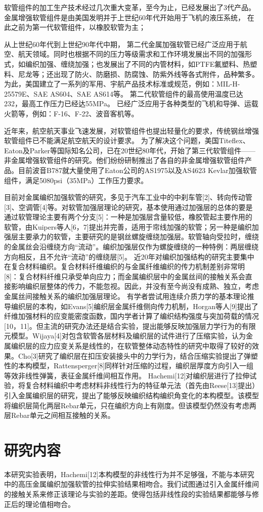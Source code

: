 软管组件的加工生产技术经过几次重大变革，至今为止，已经发展出了3代产品。
金属增强软管组件是由美国发明并于上世纪60年代开始用于飞机的液压系统，
在此之前为第一代软管组件，以橡胶软管为主；

从上世纪60年代到上世纪90年代中期，
第二代金属加强软管已经广泛应用于航空、航天领域。同时也根据不同的压力等级需求和工作环境发展出不同的加强形式，如编织加强、缠绕加强；也发展出了不同的内管材料，如PTFE氟塑料、热塑料、尼龙等；还出现了防火、防磨损、防腐蚀、防紫外线等各式附件，品种繁多。
为此，美国建立了一系列的军用、宇航产品技术标准或规范，例如：MIL-H-25579E、SAE AS604、SAE AS614等。
第二代软管组件的最高使用温度已达232\textcelsius，最高工作压力已经达55MPa。
已经广泛应用于各种类型的飞机和导弹、运载火箭等，例如：F-16、F-22、波音客机等。


近年来，航空航天事业飞速发展，对软管组件也提出轻量化的要求，传统钢丝增强软管组件已不能满足航空航天的设计要求。
为了解决这个问题，美国Titeflex、Eaton及Parker等国际知名公司，已在20世纪80年代，开始了第三代软管组件——非金属增强软管组件的研究。他们纷纷研制推出了各自的非金属增强软管组件产品。目前波音B787就大量使用了Eaton公司的AS1975以及AS4623 Kevlar加强软管组件，满足5080psi（35MPa）工作压力要求。


目前对金属编织加强软管的研究，多见于汽车工业中的中刹车管[2]、转向传动管[3]、空调管[4]等。对软管加强层理论的研究，基本使用通过加强层的总体的要是通过软管理论主要有两个分支[5]：一种是加强层含量较低，橡胶管起主要作用的软管，由Kuipers等人[6，7]提出并完善，适用于帘线加强的软管；另一种是编织加强层主要承力的软管，主要研究的是钢丝螺旋缠绕加强层。软管轴向受拉时，缠绕的金属丝会沿缠绕方向“流动”。编织加强层仅作为螺旋缠绕的一种特例：两层缠绕方向相反，且不允许“流动”的缠绕层[5]。
近20年对编织加强结构的研究主要集中在复合材料编织。复合材料纤维编织的与金属纤维编织的传力机制差别非常明[8]：复合材料纤维只承受单向应力；而金属编织层中的金属丝间的接触关系会直接影响编织层整体的传力，不能忽视。因此，并没有至今尚没有成熟、独立，考虑金属丝间接触关系的编织加强层理论。
有学者尝试用连续介质力学的基本理论推导编织层的本构，如Evans[5]编织层金属纤维侧向传力机制，Horgan等人[9]提出了纤维加强材料的应变能密度函数，国内学者计算了编织结构强度与突加荷载的情况[10，11]。但主流的研究办法还是结合实验，提出能够反映加强层力学行为的有限元模型。Wijaya[4]对包含软管各层材料及编织层的试件进行了压缩实验，认为金属编织层的应力应变关系是线性的，在软管整体动态特性的研究中取得了较好的效果。Cho[3]研究了编织层在扣压安装接头中的力学行为，结合压缩实验提出了弹塑性的本构模型，Rattensperger[8]同样针对压缩的过程，编织层厚度方向引入一组等效非线性弹簧，表征金属纤维间相互作用。
Hachemi[12]对编织层进行了拉伸试验，将复合材料编织中考虑材料非线性行为的特征单元法（首先由Reese[13]提出）引入金属编织层的研究，提出了能够反映编织结构编织角变化的本构模型。该模型将编织层简化两层Rebar单元，只在编织方向上有刚度。但该模型仍然没有考虑两层Rebar单元之间相互接触的关系。

\section{研究内容}
本研究实验表明，Hachemi[12]本构模型的非线性行为并不足够强，不能与本研究中的高压金属编织加强软管的拉伸实验结果相吻合。我们试图通过引入金属纤维间的接触关系来修正该理论与实验的差距。使得包括非线性段的实验结果都能够与修正后的理论值相吻合。
 
